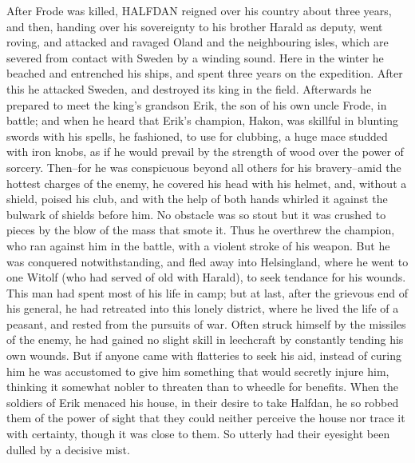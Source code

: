 \documentclass[10pt,a4paper]{report}
\begin{document}
After Frode was killed, HALFDAN reigned over his country about three years, and then, handing over his sovereignty to his brother Harald as deputy, went roving, and attacked and ravaged Oland and the neighbouring isles, which are severed from contact with Sweden by a winding sound. Here in the winter he beached and entrenched his ships, and spent three years on the expedition. After this he attacked Sweden, and destroyed its king in the field. Afterwards he prepared to meet the king's grandson Erik, the son of his own uncle Frode, in battle; and when he heard that Erik's champion, Hakon, was skillful in blunting swords with his spells, he fashioned, to use for clubbing, a huge mace studded with iron knobs, as if he would prevail by the strength of wood over the power of sorcery. Then--for he was conspicuous beyond all others for his bravery--amid the hottest charges of the enemy, he covered his head with his helmet, and, without a shield, poised his club, and with the help of both hands whirled it against the bulwark of shields before him. No obstacle was so stout but it was crushed to pieces by the blow of the mass that smote it. Thus he overthrew the champion, who ran against him in the battle, with a violent stroke of his weapon. But he was conquered notwithstanding, and fled away into Helsingland, where he went to one Witolf (who had served of old with Harald), to seek tendance for his wounds. This man had spent most of his life in camp; but at last, after the grievous end of his general, he had retreated into this lonely district, where he lived the life of a peasant, and rested from the pursuits of war. Often struck himself by the missiles of the enemy, he had gained no slight skill in leechcraft by constantly tending his own wounds. But if anyone came with flatteries to seek his aid, instead of curing him he was accustomed to give him something that would secretly injure him, thinking it somewhat nobler to threaten than to wheedle for benefits. When the soldiers of Erik menaced his house, in their desire to take Halfdan, he so robbed them of the power of sight that they could neither perceive the house nor trace it with certainty, though it was close to them. So utterly had their eyesight been dulled by a decisive mist.\\
\end{document}
